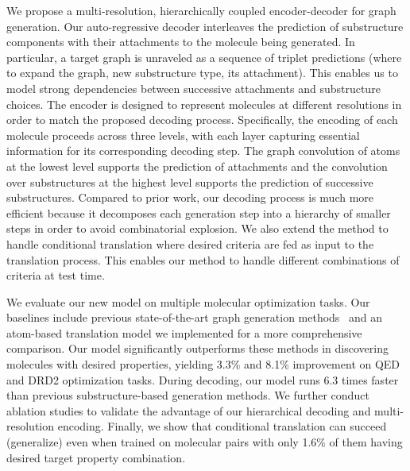 \documentclass{article} \usepackage{iclr2020_conference,times}
\begin{document}
We propose a multi-resolution, hierarchically coupled encoder-decoder for graph generation. 
Our auto-regressive decoder interleaves the prediction of substructure components with their attachments to the molecule being generated. 
In particular, a target graph is unraveled as a sequence of triplet predictions (where to expand the graph, new substructure type, its attachment).
This enables us to model strong dependencies between successive attachments and substructure choices.
The encoder is designed to represent molecules at different resolutions in order to match the proposed decoding process.
Specifically, the encoding of each molecule proceeds across three levels, with each layer capturing essential information for its corresponding decoding step.
The graph convolution of atoms at the lowest level supports the prediction of attachments and the convolution over substructures at the highest level supports the prediction of successive substructures. 
Compared to prior work, our decoding process is much more efficient because it decomposes each generation step into a hierarchy of smaller steps in order to avoid combinatorial explosion.
We also extend the method to handle conditional translation where desired criteria are fed as input to the translation process. 
This enables our method to handle different combinations of criteria at test time.


We evaluate our new model on multiple molecular optimization tasks. Our baselines include previous state-of-the-art graph generation methods~\citep{you2018graph,liu2018constrained,jin2018learning} and an atom-based translation model we implemented for a more comprehensive comparison. 
Our model significantly outperforms these methods in discovering molecules with desired properties, yielding 3.3\% and 8.1\% improvement on QED and DRD2 optimization tasks. 
During decoding, our model runs 6.3 times faster than previous substructure-based  generation methods. We further conduct ablation studies to validate the advantage of our hierarchical decoding and multi-resolution encoding.
Finally, we show that conditional translation can succeed (generalize) even when trained on molecular pairs with only 1.6\% of them having desired target property combination. 
\end{document}
